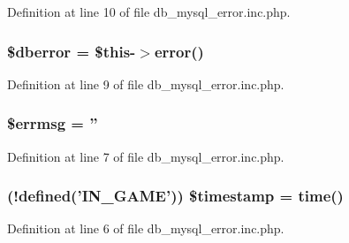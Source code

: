 Definition at line 10 of file db\+\_\+mysql\+\_\+error.\+inc.\+php.

\hypertarget{db__mysql__error_8inc_8php_abd14d508ec59cf214416a2a8edd41dc6}{
\subsubsection[{\$dberror}]{\setlength{\rightskip}{0pt plus 5cm}\$dberror = \$this-\/$>$error()}}\label{db__mysql__error_8inc_8php_abd14d508ec59cf214416a2a8edd41dc6}


Definition at line 9 of file db\+\_\+mysql\+\_\+error.\+inc.\+php.

\hypertarget{db__mysql__error_8inc_8php_a36253ac3f7114f140a51305bd2b67245}{
\subsubsection[{\$errmsg}]{\setlength{\rightskip}{0pt plus 5cm}\$errmsg = ''}}\label{db__mysql__error_8inc_8php_a36253ac3f7114f140a51305bd2b67245}


Definition at line 7 of file db\+\_\+mysql\+\_\+error.\+inc.\+php.

\hypertarget{db__mysql__error_8inc_8php_ab7b466236e0884db72ab7133299338c2}{
\subsubsection[{\$timestamp}]{ (!defined('{\bf I\+N\+\_\+\+G\+A\+M\+E}')) \$timestamp = time()}}\label{db__mysql__error_8inc_8php_ab7b466236e0884db72ab7133299338c2}


Definition at line 6 of file db\+\_\+mysql\+\_\+error.\+inc.\+php.

